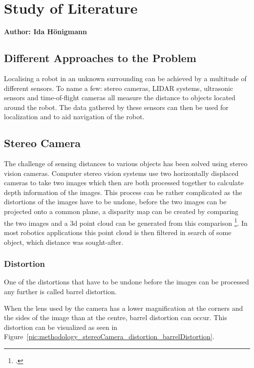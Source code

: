\chapter{Study of Literature}

\textbf{Author: Ida Hönigmann}

\section{Different Approaches to the Problem}
Localising a robot in an unknown surrounding can be achieved by a multitude of different sensors. To name a few: stereo cameras, LIDAR systems, ultrasonic sensors and time-of-flight cameras all measure the distance to objects located around the robot.
The data gathered by these sensors can then be used for localization and to aid navigation of the robot.

\section{Stereo Camera}
The challenge of sensing distances to various objects has been solved using stereo vision cameras.
Computer stereo vision systems use two horizontally displaced cameras to take two images which then are both processed together to calculate depth information of the images.
This process can be rather complicated as the distortions of the images have to be undone, before the two images can be projected onto a common plane, a disparity map can be created by comparing the two images and a 3d point cloud can be generated from this comparison \footcite{Bradski_Learning_OpenCV}. In most robotics applications this point cloud is then filtered in search of some object, which distance was sought-after.

\subsection{Distortion}
One of the distortions that have to be undone before the images can be processed any further is called barrel distortion.

When the lens used by the camera has a lower magnification at the corners and the sides of the image than at the centre, barrel distortion can occur.
This distortion can be visualized as seen in Figure~\ref{pic:methodology_stereoCamera_distortion_barrelDistortion}.


